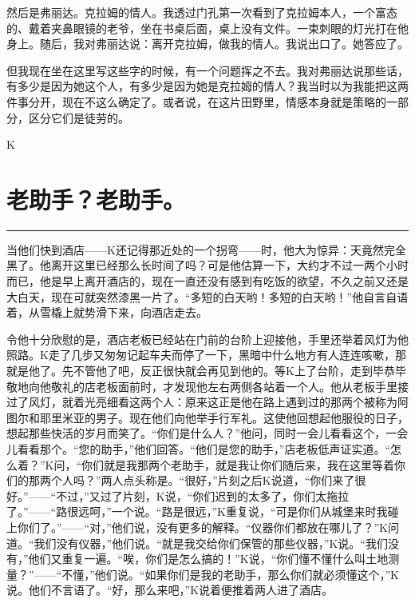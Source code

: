 \documentclass[12pt,a4paper]{article}
\begin{document}
然后是弗丽达。克拉姆的情人。我透过门孔第一次看到了克拉姆本人，一个富态的、戴着夹鼻眼镜的老爷，坐在书桌后面，桌上没有文件。一束刺眼的灯光打在他身上。随后，我对弗丽达说：离开克拉姆，做我的情人。我说出口了。她答应了。



但我现在坐在这里写这些字的时候，有一个问题挥之不去。我对弗丽达说那些话，有多少是因为她这个人，有多少是因为她是克拉姆的情人？我当时以为我能把这两件事分开，现在不这么确定了。或者说，在这片田野里，情感本身就是策略的一部分，区分它们是徒劳的。



K

\newpage
\section{老助手？老助手。}
\vspace{0.5em}
\vspace{0.3em}

\noindent\rule{\textwidth}{0.4pt}

\vspace{0.3em}



当他们快到酒店——K还记得那近处的一个拐弯——时，他大为惊异：天竟然完全黑了。他离开这里已经那么长时间了吗？可是他估算一下，大约才不过一两个小时而已，他是早上离开酒店的，现在一直还没有感到有吃饭的欲望，不久之前又还是大白天，现在可就突然漆黑一片了。“多短的白天哟！多短的白天哟！”他自言自语着，从雪橇上就势滑下来，向酒店走去。

令他十分欣慰的是，酒店老板已经站在门前的台阶上迎接他，手里还举着风灯为他照路。K走了几步又匆匆记起车夫而停了一下，黑暗中什么地方有人连连咳嗽，那就是他了。先不管他了吧，反正很快就会再见到他的。等K上了台阶，走到毕恭毕敬地向他敬礼的店老板面前时，才发现他左右两侧各站着一个人。他从老板手里接过了风灯，就着光亮细看这两个人：原来这正是他在路上遇到过的那两个被称为阿图尔和耶里米亚的男子。现在他们向他举手行军礼。这使他回想起他服役的日子，想起那些快活的岁月而笑了。“你们是什么人？”他问，同时一会儿看看这个，一会儿看看那个。“您的助手，”他们回答。“他们是您的助手，”店老板低声证实道。“怎么着？”K问，“你们就是我那两个老助手，就是我让你们随后来，我在这里等着你们的那两个人吗？”两人点头称是。“很好，”片刻之后K说道，“你们来了很好。”——“不过，”又过了片刻，K说，“你们迟到的太多了，你们太拖拉了。”——“路很远呵，”一个说。“路是很远，”K重复说，“可是你们从城堡来时我碰上你们了。”——“对，”他们说，没有更多的解释。“仪器你们都放在哪儿了？”K问道。“我们没有仪器，”他们说。“就是我交给你们保管的那些仪器，”K说。“我们没有，”他们又重复一遍。“唉，你们是怎么搞的！”K说，“你们懂不懂什么叫土地测量？”——“不懂，”他们说。“如果你们是我的老助手，那么你们就必须懂这个，”K说。他们不言语了。“好，那么来吧，”K说着便推着两人进了酒店。
\end{document}
